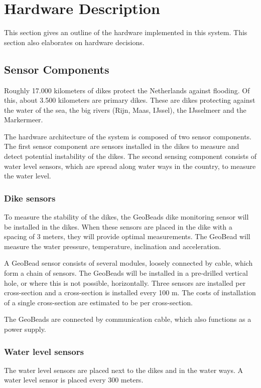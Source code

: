\clearpage
\section{Hardware Description}
\label{sec:hardware-description}
This section gives an outline of the hardware implemented in this system. This section also elaborates on hardware decisions.

\subsection{Sensor Components}
\label{subsec:sensing-components}
Roughly 17.000 kilometers of dikes protect the Netherlands against flooding\cite{DMC}. Of this, about 3.500 kilometers are primary dikes\cite{waterwijzer}. These are dikes protecting against the water of the sea, the big rivers (Rijn, Maas, IJssel), the IJsselmeer and the Markermeer. 

The hardware architecture of the system is composed of two sensor components. The first sensor component are sensors installed in the dikes to measure and detect potential instability of the dikes.
The second sensing component consists of water level sensors, which are spread along water ways in the country, to measure the water level. 

\subsubsection{Dike sensors}
To measure the stability of the dikes, the GeoBeads dike monitoring sensor will be installed in the dikes. When these sensors are placed in the dike with a spacing of 3 meters, they will provide optimal measurements\cite{ng180levee}. The GeoBead will measure the water pressure, temperature, inclination and acceleration.

A GeoBead sensor consists of several modules, loosely connected by cable, which form a chain of sensors. The GeoBeads will be installed in a pre-drilled vertical hole, or where this is not possible, horizontally. Three sensors are installed per cross-section and a cross-section is installed every 100 m. The costs of installation of a single cross-section are estimated to be  per cross-section\cite{TUDelftPHD}.%

The GeoBeads are connected by communication cable, which also functions as a power supply. 

\subsubsection{Water level sensors}
The water level sensors are placed next to the dikes and in the water ways. A water level sensor is placed every 300 meters. %

